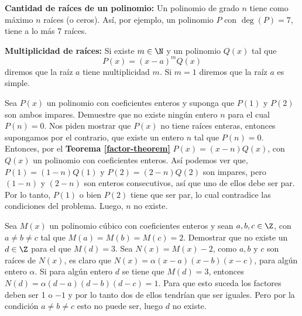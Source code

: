 {    \textbf{Cantidad de raíces de un polinomio:} Un polinomio de grado $n$ tiene como máximo $n$ raíces (o ceros). Así, por ejemplo, un polinomio $P$ con $\deg{(P)} = 7$, tiene a lo más 7 raíces.

    \textbf{Multiplicidad de raíces:} Si existe $m \in \N$ y un polinomio $Q(x)$ tal que \[P(x) = (x - a)^m Q(x)\] diremos que la raíz $a$ tiene multiplicidad $m$. Si $m = 1$ diremos que la raíz $a$ es simple.

    \begin{example}
        Sea $P(x)$ un polinomio con coeficientes enteros y suponga que $P(1)$ y $P(2)$ son ambos impares. Demuestre que no existe ningún entero $n$ para el cual $P(n) = 0$.
        \solution
        {
            Nos piden mostrar que $P(x)$ no tiene raíces enteras, entonces supongamos por el contrario, que existe un entero $n$ tal que $P(n) = 0$. Entonces, por el \textbf{Teorema \ref{factor-theorem}} $P(x) = (x - n)Q(x)$, con $Q(x)$ un polinomio con coeficientes enteros. Así podemos ver que, $P(1) = (1 - n)Q(1)$ y $P(2) = (2 - n)Q(2)$ son impares, pero $(1 - n)$ y $(2 - n)$ son enteros consecutivos, así que uno de ellos debe ser par. Por lo tanto, $P(1)$ o bien $P(2)$ tiene que ser par, lo cual contradice las condiciones del problema. Luego, $n$ no existe.
        }
    \end{example}

    \begin{example}
        Sea $M(x)$ un polinomio cúbico con coeficientes enteros y sean $a, b, c \in \Z$, con $a \neq b \neq c$ tal que $M(a) = M(b) = M(c) = 2$. Demostrar que no existe un $d \in \Z$ para el que $M(d) = 3.$
        \solution
        {
            Sea $N(x) = M(x) - 2$, como $a, b \mbox{ y } c$ son raíces de $N(x)$, es claro que $N(x) = \alpha (x - a)(x - b)(x - c)$, para algún entero $\alpha$. Si para algún entero $d$ se tiene que $M(d) = 3$, entonces $N(d) = \alpha (d - a)(d - b)(d - c) = 1$. Para que esto suceda los factores deben ser 1 o $-1$ y por lo tanto dos de ellos tendrían que ser iguales. Pero por la condición $a \neq b \neq c$ esto no puede ser, luego $d$ no existe.
        }
    \end{example}
}
\label{subsec:definiciones}

